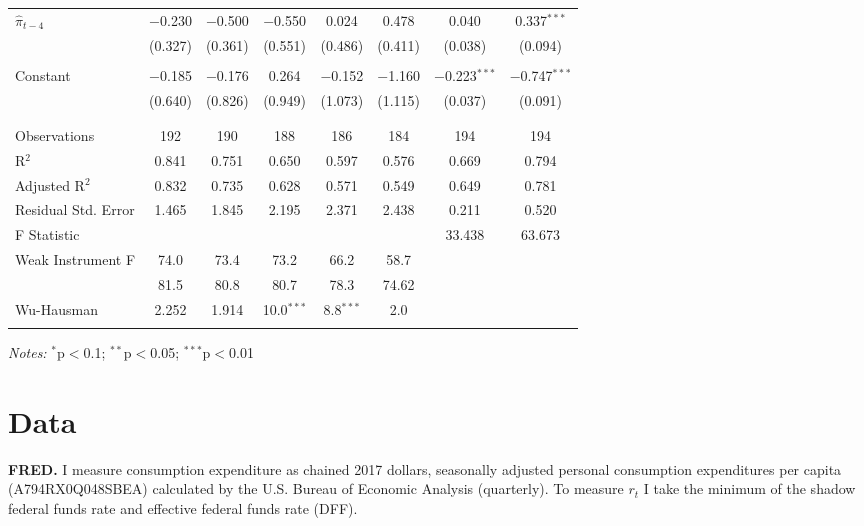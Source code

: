 \documentclass[12pt]{article}
\numberwithin{equation}{section}
\begin{document}
\begin{table}[!htbp]
\begin{threeparttable}
\begin{tabular}{@{\extracolsep{2pt}}lccccccc}
    $\hat\pi_{t-4}$  & $-$0.230 & $-$0.500 & $-$0.550 & 0.024 & 0.478 & 0.040 & 0.337$^{***}$ \\ 
    & (0.327) & (0.361) & (0.551) & (0.486) & (0.411) & (0.038) & (0.094) \\ 
    & & & & & & \\ 
   Constant  & $-$0.185 & $-$0.176 & 0.264 & $-$0.152 & $-$1.160 & $-$0.223$^{***}$ & $-$0.747$^{***}$ \\ 
   & (0.640) & (0.826) & (0.949) & (1.073) & (1.115) & (0.037) & (0.091) \\ 
    & & & & & & \\ 
  \hline \\[-1.8ex] 
  Observations & 192 & 190 & 188 & 186 & 184 & 194 & 194 \\ 
  R$^{2}$ & 0.841 & 0.751 & 0.650 & 0.597 & 0.576 & 0.669 & 0.794 \\ 
  Adjusted R$^{2}$ & 0.832 & 0.735 & 0.628 & 0.571 & 0.549 & 0.649 & 0.781 \\ 
  Residual Std. Error & 1.465 & 1.845 & 2.195 & 2.371 & 2.438 & 0.211 & 0.520 \\ 
  F Statistic &  &  &  &  &  & 33.438& 63.673 \\ 
  Weak Instrument F & 74.0&73.4 &73.2 & 66.2& 58.7\\
    &  81.5 &80.8& 80.7 &78.3 & 74.62\\
  Wu-Hausman & 2.252 & 1.914& 10.0$^{***}$&8.8$^{***}$& 2.0\\
  \hline 
  \hline \\[-1.8ex] 
  \end{tabular} 
  \begin{tablenotes}[flushleft]
\item[] \textit{Notes:}  $^{*}$p$<$0.1; $^{**}$p$<$0.05; $^{***}$p$<$0.01
\end{tablenotes}
\end{threeparttable}
  \end{table} 


\section{Data} 

\noindent\textbf{FRED.} I measure consumption expenditure as chained 2017 dollars, seasonally adjusted personal consumption expenditures per capita (A794RX0Q048SBEA) calculated by the U.S. Bureau of Economic Analysis (quarterly). 
To measure $r_t$ I take the minimum of the shadow federal funds rate \citep{WuXia2016} and effective federal funds rate (DFF).
\end{document}
